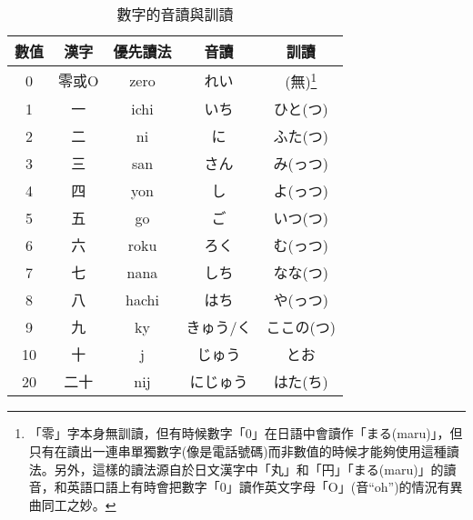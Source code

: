 \documentclass[12pt]{article}
\begin{document}
\begin{CJK}{UTF8}{nsung}
\begin{longtable}{ccccc}
\caption{數字的音讀與訓讀}\\
數值 & 	漢字 &	優先讀法 & 音讀 & 訓讀\\
\hline
\begin{comment}
\end{comment}
0 &	零或O & zero &	れい &	(無)\footnote{「零」字本身無訓讀，但有時候數字「0」在日語中會讀作「まる(maru)」，但只有在讀出一連串單獨數字(像是電話號碼)而非數值的時候才能夠使用這種讀法。另外，這樣的讀法源自於日文漢字中「丸」和「円」「まる(maru)」的讀音，和英語口語上有時會把數字「0」讀作英文字母「O」(音``oh'')的情況有異曲同工之妙。} \\
\hline
1 &	一 &	ichi &	いち  &	ひと(つ)\\
\hline
2 &	二 &	ni &	に &	ふた(つ)\\
\hline
3 &	三 &	san &	さん &	み(っつ)\\
\hline
4 &	四 &	yon &	し &	よ(っつ)\\
\hline
5 &	五 &	go &	ご &	いつ(つ)\\
\hline
6 &	六 &	roku &	ろく  &	む(っつ)\\
\hline
7 &	七 &	nana &	しち  &	なな(つ)\\
\hline
8 &	八 &	hachi &	はち  &	や(っつ)\\
\hline
9 &	九 &	ky &	きゅう/く   &	ここの(つ)\\
\hline
10 &	十 &	j &	じゅう &	とお\\
\hline
20 &	二十 &	nij &	にじゅう &	はた(ち)\\
\hline

\end{longtable}





\end{CJK}
\end{document}
